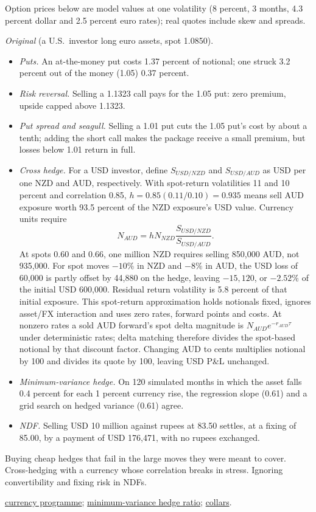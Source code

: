 \begin{qfmethod}
 Option prices below are model values at one volatility (8 percent, 3 months, 4.3 percent dollar and 2.5 percent euro rates); real quotes include skew and spreads.

 \emph{Original} (a U.S.\ investor long euro assets, spot 1.0850).
\begin{itemize}
\item \emph{Puts.} An at-the-money put costs 1.37 percent of notional; one struck 3.2 percent out of the money (1.05) 0.37 percent.
\item \emph{Risk reversal.} Selling a 1.1323 call pays for the 1.05 put: zero premium, upside capped above 1.1323.
\item \emph{Put spread and seagull.} Selling a 1.01 put cuts the 1.05 put's cost by about a tenth; adding the short call makes the package receive a small premium, but losses below 1.01 return in full.
\item \emph{Cross hedge.} For a USD investor, define $S_{USD/NZD}$ and $S_{USD/AUD}$ as USD per one NZD and AUD, respectively. With spot-return volatilities 11 and 10 percent and correlation 0.85, $h=0.85(0.11/0.10)=0.935$ means sell AUD exposure worth 93.5 percent of the NZD exposure's USD value. Currency units require
\[
N_{AUD}=h N_{NZD}\frac{S_{USD/NZD}}{S_{USD/AUD}}.
\]
At spots 0.60 and 0.66, one million NZD requires selling 850{,}000 AUD, not 935{,}000. For spot moves $-10\%$ in NZD and $-8\%$ in AUD, the USD loss of 60{,}000 is partly offset by 44{,}880 on the hedge, leaving $-15{,}120$, or $-2.52\%$ of the initial USD 600{,}000. Residual return volatility is 5.8 percent of that initial exposure. This spot-return approximation holds notionals fixed, ignores asset/FX interaction and uses zero rates, forward points and costs. At nonzero rates a sold AUD forward's spot delta magnitude is $N_{AUD}e^{-r_{AUD}\tau}$ under deterministic rates; delta matching therefore divides the spot-based notional by that discount factor. Changing AUD to cents multiplies notional by 100 and divides its quote by 100, leaving USD P\&L unchanged.
\item \emph{Minimum-variance hedge.} On 120 simulated months in which the asset falls 0.4 percent for each 1 percent currency rise, the regression slope (0.61) and a grid search on hedged variance (0.61) agree.
\item \emph{NDF.} Selling USD 10 million against rupees at 83.50 settles, at a fixing of 85.00, by a payment of USD 176{,}471, with no rupees exchanged.
\end{itemize}

 Buying cheap hedges that fail in the large moves they were meant to cover. Cross-hedging with a currency whose correlation breaks in stress. Ignoring convertibility and fixing risk in NDFs.

 \hyperref[meth:currency-hedging-programme]{currency programme}; \hyperref[mod:minimum-variance-hedge-ratio]{minimum-variance hedge ratio}; \hyperref[meth:covered-call-protective-put]{collars}.

\end{qfmethod}
